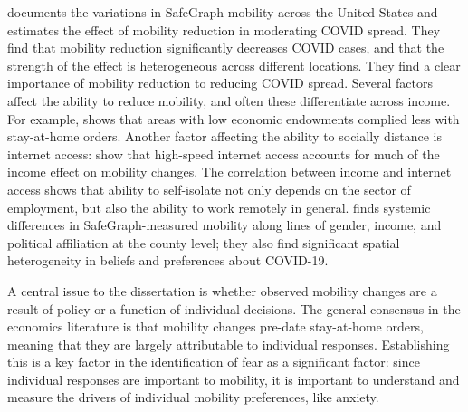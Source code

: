 \documentclass{article}
\begin{document}
\textcite{glaeserHowMuchDoes2020} documents the variations in SafeGraph mobility across the United States and estimates the effect of mobility reduction in moderating COVID spread. They find that mobility reduction significantly decreases COVID cases, and that the strength of the effect is heterogeneous across different locations. They find a clear importance of mobility reduction to reducing COVID spread. Several factors affect the ability to reduce mobility, and often these differentiate across income. For example, \textcite{wrightPovertyEconomicDislocation2020} shows that areas with low economic endowments complied less with stay-at-home orders. Another factor affecting the ability to socially distance is internet access: \textcite{chiouSocialDistancingInternet2020} show that high-speed internet access accounts for much of the income effect on mobility changes. The correlation between income and internet access shows that ability to self-isolate not only depends on the sector of employment, but also the ability to work remotely in general. \textcite{fanHeterogeneousActionsBeliefs2020} finds systemic differences in SafeGraph-measured mobility along lines of gender, income, and political affiliation at the county level; they also find significant spatial heterogeneity in beliefs and preferences about COVID-19.

A central issue to the dissertation is whether observed mobility changes are a result of policy or a function of individual decisions. The general consensus in the economics literature is that mobility changes pre-date stay-at-home orders, meaning that they are largely attributable to individual responses. Establishing this is a key factor in the identification of fear as a significant factor: since individual responses are important to mobility, it is important to understand and measure the drivers of individual mobility preferences, like anxiety.
\end{document}

